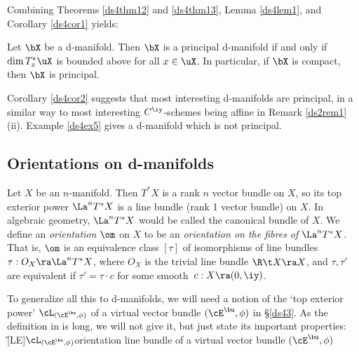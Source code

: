 \documentclass{article}
\begin{document}
Combining Theorems \ref{ds4thm12} and \ref{ds4thm13}, Lemma
\ref{ds4lem1}, and Corollary \ref{ds4cor1} yields:

\begin{cor} Let\/ $\bX$ be a d-manifold. Then $\bX$ is a principal
d-manifold if and only if\/ $\dim T^*_x\uX$ is bounded above for
all\/ $x\in\uX$. In particular, if\/ $\bX$ is compact, then $\bX$ is
principal.
\label{ds4cor2}
\end{cor}

Corollary \ref{ds4cor2} suggests that most interesting d-manifolds
are principal, in a similar way to most interesting $C^\iy$-schemes
being affine in Remark \ref{ds2rem1}(ii). Example \ref{ds4ex5} gives
a d-manifold which is not principal.

\subsection{Orientations on d-manifolds}
\label{ds48}

Let $X$ be an $n$-manifold. Then $T^*X$ is a rank $n$ vector bundle
on $X$, so its top exterior power $\La^nT^*X$ is a line bundle (rank
1 vector bundle) on $X$. In algebraic geometry, $\La^nT^*X$ would be
called the canonical bundle of $X$. We define an {\it orientation\/}
$\om$ on $X$ to be an {\it orientation on the fibres of\/}
$\La^nT^*X$. That is, $\om$ is an
equivalence class $[\tau]$ of isomorphisms of line bundles
$\tau:O_X\ra\La^nT^*X$, where $O_X$ is the trivial line bundle $\R\t
X\ra X$, and $\tau,\tau'$ are equivalent if $\tau'=\tau\cdot c$ for
some smooth~$c:X\ra(0,\iy)$.

To generalize all this to d-manifolds, we will need a notion of the
`top exterior power' $\cL_{\smash{ (\cE^\bu,\phi)}}$ of a virtual
vector bundle $(\cE^\bu,\phi)$ in \S\ref{ds43}. As the definition in
\cite[\S 4.5]{Joyc6} is long, we will not give it, but just state
its important properties:\G[LE]{$\cL_{\smash{
(\cE^\bu,\phi)}}$}{orientation line bundle of a virtual vector
bundle $(\cE^\bu,\phi)$}
\end{document}
